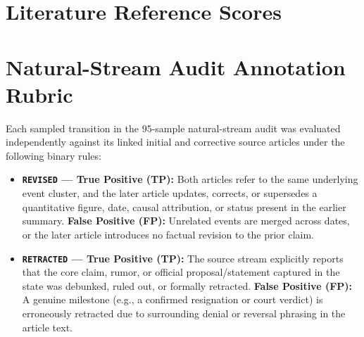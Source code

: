 \documentclass[journal]{IEEEtran}
\begin{document}
\appendices
\section{Literature Reference Scores}
\label{app:legacy}

\begin{table}[h]
\centering
\caption{Published Literature Reference Scores on \textbf{T17} ($9$ Topics --- Different Backbones/Static Settings, Contextual Only)}
\label{tab:lit_results}
\renewcommand{\arraystretch}{1.12}
\end{table}





\section{Natural-Stream Audit Annotation Rubric}
\label{app:rubric}

Each sampled transition in the $95$-sample natural-stream audit was evaluated independently against its linked initial and corrective source articles under the following binary rules:
\begin{itemize}
    \item \textbf{\texttt{REVISED} --- True Positive (TP):} Both articles refer to the same underlying event cluster, and the later article updates, corrects, or supersedes a quantitative figure, date, causal attribution, or status present in the earlier summary. \textbf{False Positive (FP):} Unrelated events are merged across dates, or the later article introduces no factual revision to the prior claim.
    \item \textbf{\texttt{RETRACTED} --- True Positive (TP):} The source stream explicitly reports that the core claim, rumor, or official proposal/statement captured in the state was debunked, ruled out, or formally retracted. \textbf{False Positive (FP):} A genuine milestone (e.g., a confirmed resignation or court verdict) is erroneously retracted due to surrounding denial or reversal phrasing in the article text.
\end{itemize}
\end{document}
